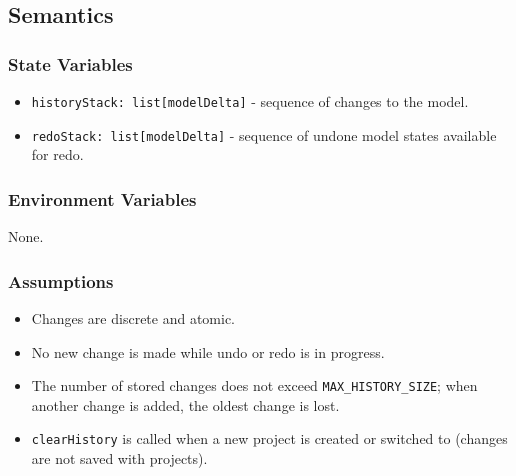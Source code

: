 \documentclass[12pt, titlepage]{article}
\begin{document}
\subsection{Semantics}
\subsubsection{State Variables}
\begin{itemize}
  \item \texttt{historyStack: list[modelDelta]} - sequence of changes to the model.
  \item \texttt{redoStack: list[modelDelta]} - sequence of undone model states available for redo.
\end{itemize}

\subsubsection{Environment Variables}
None.

\subsubsection{Assumptions}
\begin{itemize}
  \item Changes are discrete and atomic.
  \item No new change is made while undo or redo is in progress.
  \item The number of stored changes does not exceed \texttt{MAX\_HISTORY\_SIZE}; when another change is added, the oldest change is lost.
  \item \texttt{clearHistory} is called when a new project is created or switched to (changes are not saved with projects).
\end{itemize}
\end{document}

